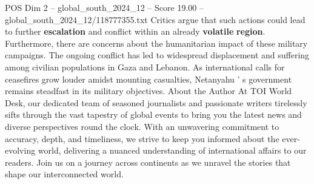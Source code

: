 \begin{textsample}{POS Dim 2 – global\_south\_2024\_12 – Score 19.00 – global\_south\_2024\_12/118777355.txt}
Critics argue that such actions could lead to further \textbf{escalation} and conflict within an already \textbf{volatile} \textbf{region}.
Furthermore, there are concerns about the humanitarian impact of these military campaigns.
The ongoing conflict has led to widespread displacement and suffering among civilian populations in Gaza and Lebanon.
As international calls for ceasefires grow louder amidst mounting casualties, Netanyahu ' s government remains steadfast in its military objectives.
About the Author At TOI World Desk, our dedicated team of seasoned journalists and passionate writers tirelessly sifts through the vast tapestry of global events to bring you the latest news and diverse perspectives round the clock.
With an unwavering commitment to accuracy, depth, and timeliness, we strive to keep you informed about the ever-evolving world, delivering a nuanced understanding of international affairs to our readers.
Join us on a journey across continents as we unravel the stories that shape our interconnected world.

\end{textsample}
